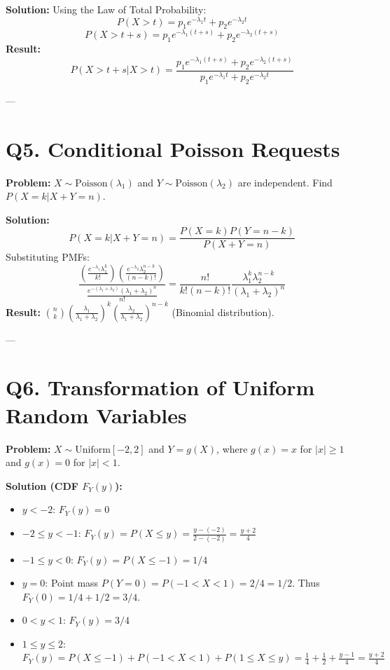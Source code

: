 \documentclass{article}
\begin{document}
\textbf{Solution:} Using the Law of Total Probability:
\[ P(X > t) = p_1 e^{-\lambda_1 t} + p_2 e^{-\lambda_2 t} \]
\[ P(X > t+s) = p_1 e^{-\lambda_1(t+s)} + p_2 e^{-\lambda_2(t+s)} \]
\textbf{Result:} \[ P(X > t+s | X > t) = \frac{p_1 e^{-\lambda_1(t+s)} + p_2 e^{-\lambda_2(t+s)}}{p_1 e^{-\lambda_1 t} + p_2 e^{-\lambda_2 t}} \]

---

\section*{Q5. Conditional Poisson Requests}
\textbf{Problem:} $X \sim \text{Poisson}(\lambda_1)$ and $Y \sim \text{Poisson}(\lambda_2)$ are independent. Find $P(X=k | X+Y=n)$.

\textbf{Solution:}
\[ P(X=k | X+Y=n) = \frac{P(X=k)P(Y=n-k)}{P(X+Y=n)} \]
Substituting PMFs:
\[ \frac{\left(\frac{e^{-\lambda_1}\lambda_1^k}{k!}\right)\left(\frac{e^{-\lambda_2}\lambda_2^{n-k}}{(n-k)!}\right)}{\frac{e^{-(\lambda_1+\lambda_2)}(\lambda_1+\lambda_2)^n}{n!}} = \frac{n!}{k!(n-k)!} \frac{\lambda_1^k \lambda_2^{n-k}}{(\lambda_1+\lambda_2)^n} \]
\textbf{Result:} $\binom{n}{k} \left(\frac{\lambda_1}{\lambda_1+\lambda_2}\right)^k \left(\frac{\lambda_2}{\lambda_1+\lambda_2}\right)^{n-k}$ (Binomial distribution).

---

\section*{Q6. Transformation of Uniform Random Variables}
\textbf{Problem:} $X \sim \text{Uniform}[-2, 2]$ and $Y = g(X)$, where $g(x)=x$ for $|x| \ge 1$ and $g(x)=0$ for $|x| < 1$.

\textbf{Solution (CDF $F_Y(y)$):}
\begin{itemize}
    \item $y < -2$: $F_Y(y) = 0$
    \item $-2 \le y < -1$: $F_Y(y) = P(X \le y) = \frac{y - (-2)}{2 - (-2)} = \frac{y+2}{4}$
    \item $-1 \le y < 0$: $F_Y(y) = P(X \le -1) = 1/4$
    \item $y = 0$: Point mass $P(Y=0) = P(-1 < X < 1) = 2/4 = 1/2$. Thus $F_Y(0) = 1/4 + 1/2 = 3/4$.
    \item $0 < y < 1$: $F_Y(y) = 3/4$
    \item $1 \le y \le 2$: $F_Y(y) = P(X \le -1) + P(-1 < X < 1) + P(1 \le X \le y) = \frac{1}{4} + \frac{1}{2} + \frac{y-1}{4} = \frac{y+2}{4}$
\end{itemize}
\end{document}
